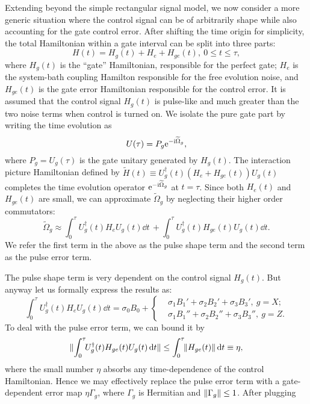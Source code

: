 \documentclass[b5paper,11pt]{article}
\newcommand{\wt}[1]{\widetilde{#1}}
\begin{document}
Extending beyond the simple rectangular signal model, we now consider a more generic situation where the control signal can be of arbitrarily shape while also accounting for the gate control error. After shifting the time origin for simplicity, the total Hamiltonian within a gate interval can be split into three parts:
\begin{equation}\label{eq:Hami-3parts}
 H(t)= H_g(t) +  H_e +  H_{ge}(t), \ 0\le t\le \tau,
\end{equation}
where $H_g(t)$ is the ``gate'' Hamiltonian, responsible for the perfect gate; 
$H_e$ is the system-bath coupling Hamilton responsible for the free evolution noise,
and $H_{ge}(t)$ is the gate error Hamiltonian responsible for the control error. It is assumed that the control signal $H_g(t)$ is pulse-like and much greater than the two noise terms when control is turned on.
We isolate the pure gate part by writing the time evolution as 
\begin{equation}
 U(\tau)=P_g \upe^{-\upi \wt \Omega_g},
\end{equation}
 where $P_g=U_g(\tau)$ is the gate unitary generated by $H_g(t)$.
The interaction picture Hamiltonian defined by
$\wt H(t)\equiv U_g^\dagger(t) (H_e + H_{ge} (t)) U_g(t)$ completes the time evolution operator $\upe^{-\upi \wt \Omega_g}$
at $t=\tau$. 
Since both $H_e(t)$ and $H_{ge}(t)$ are small, we can approximate $\wt \Omega_g$ by neglecting their higher order commutators:
\begin{equation}
 \wt \Omega_g \approx\! \int_0^\tau\!\! U_g^\dagger(t) H_e U_g(t) \dd t\, + \! \int_0^\tau\!\! U_g^\dagger(t) H_{ge}(t) U_g(t) \dd t.
\end{equation} 
We refer the first term in the above as the pulse shape term and the second term as the pulse error term. 

The pulse shape term is very dependent on the control signal $H_g(t)$. But anyway let us formally express the results as:
\begin{equation}
\int_0^\tau\!\! U_g^\dagger(t) H_e U_g(t) \dd t =\sigma_0 B_0  +  \left\{
 \begin{aligned}
   & \sigma_1 B_1' + \sigma_2 B_2'+\sigma_3 B_3',\ g=X;\\
    &\sigma_1 B_1'' + \sigma_2 B_2''+\sigma_3 B_3'',\ g=Z.
 \end{aligned}
 \right.
\end{equation}
To deal with the pulse error term,  we can bound it by
\begin{equation}
 \Vert {\int_0^\tau\!\! U_g^\dagger(t) H_{ge}(t) U_g(t) \mathop{}\!\mathrm{d}t} \Vert 
 \le  \int_0^\tau\!\! \Vert {H_{ge}(t)} \Vert \mathop{}\!\mathrm{d} t \equiv  \eta,
\end{equation}
where the small number $\eta$ absorbs any time-dependence of the control Hamiltonian.
Hence we may effectively replace the pulse error term with a gate-dependent error map $\eta \Gamma_g$, where $\Gamma_g$ is Hermitian and $\Vert {\Gamma_g} \Vert\le 1$.
After plugging 
\end{document}
